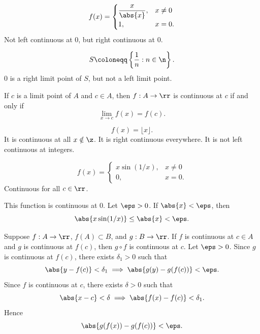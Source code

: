 \begin{example}
    \[
        f(x) = \begin{cases}
                   \dfrac{x}{\abs{x}}, &x\neq 0\\
                   1, &x = 0.
        \end{cases}
    \]
    Not left continuous at $0$, but right continuous at $0$.
\end{example}

\begin{example}
    \[
        S \coloneqq \left\{\dfrac{1}{n} : n\in\n\right\}.
    \]
    $0$ is a right limit point of $S$, but not a left limit point.
\end{example}

\begin{remark}
    If $c$ is a limit point of $A$ and $c\in A$, then $f:A\to\rr$ is continuous at $c$ if and only if
    \[
        \lim_{x\to c} f(x) = f(c).
    \]
\end{remark}

\begin{example}
    \[
        f(x) = \lfloor x \rfloor.
    \]
    It is continuous at all $x\notin\z$.
    It is right continuous everywhere.
    It is not left continuous at integers.
\end{example}

\begin{example}
    \[
        f(x) = \begin{cases}
                   x\sin(1/x), &x\neq 0\\
                   0, &x = 0.
        \end{cases}
    \]
    Continuous for all $c\in\rr$.
\end{example}

\begin{proposition}{
    This function is continuous at $0$.
}
    Let $\eps > 0$.
    If $\abs{x}<\eps$, then
    \[
        \abs{x\sin(1/x)} \leq \abs{x} < \eps.
    \]
\end{proposition}

\begin{theorem}{
    Suppose $f:A\to \rr$, $f(A)\subset B$, and $g:B\to\rr$.
    If $f$ is continuous at $c\in A$ and $g$ is continuous at $f(c)$, then $g\circ f$ is continuous at $c$.
}
    Let $\eps > 0$.
    Since $g$ is continuous at $f(c)$, there exists $\delta_1 > 0$ such that
    \[
        \abs{y - f(c)} < \delta_1 \implies \abs{g(y) - g(f(c))} < \eps.
    \]
    Since $f$ is continuous at $c$, there exists $\delta > 0$ such that
    \[
        \abs{x-c} < \delta \implies \abs{f(x)-f(c)} < \delta_1.
    \]
    Hence
    \[
        \abs{g(f(x)) - g(f(c))} < \eps.
    \]
\end{theorem}


